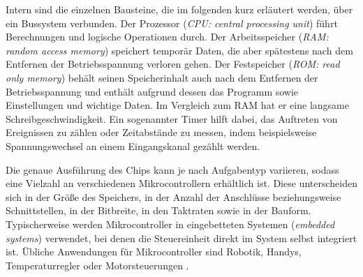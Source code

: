 Intern sind die einzelnen Bausteine, die im folgenden kurz erläutert werden, über ein Bussystem verbunden.
Der Prozessor (\textit{CPU: central processing unit}) führt Berechnungen und logische Operationen durch.
Der Arbeitsspeicher (\textit{RAM: random access memory}) speichert temporär Daten, die aber spätestens nach dem Entfernen der Betriebsspannung verloren gehen.
Der Festspeicher (\textit{ROM: read only memory}) behält seinen Speicherinhalt auch nach dem Entfernen der Betriebsspannung und enthält aufgrund dessen das Programm sowie Einstellungen und wichtige Daten. Im Vergleich zum RAM hat er eine langsame Schreibgeschwindigkeit. 
Ein sogenannter Timer hilft dabei, das Auftreten von Ereignissen zu zählen oder Zeitabstände zu messen, indem beispielsweise Spannungswechsel an einem Eingangskanal gezählt werden. 

Die genaue Ausführung des Chips kann je nach Aufgabentyp variieren, sodass eine Vielzahl an verschiedenen Mikrocontrollern erhältlich ist. Diese unterscheiden sich in der Größe des Speichers, in der Anzahl der Anschlüsse beziehungsweise Schnittstellen, in der Bitbreite, in den Taktraten sowie in der Bauform. Typischerweise werden Mikrocontroller in eingebetteten Systemen (\textit{embedded systems}) verwendet, bei denen die Steuereinheit direkt im System selbst integriert ist. Übliche Anwendungen für Mikrocontroller sind Robotik, Handys, Temperaturregler oder Motorsteuerungen \cite{Brinkschulte}. 

